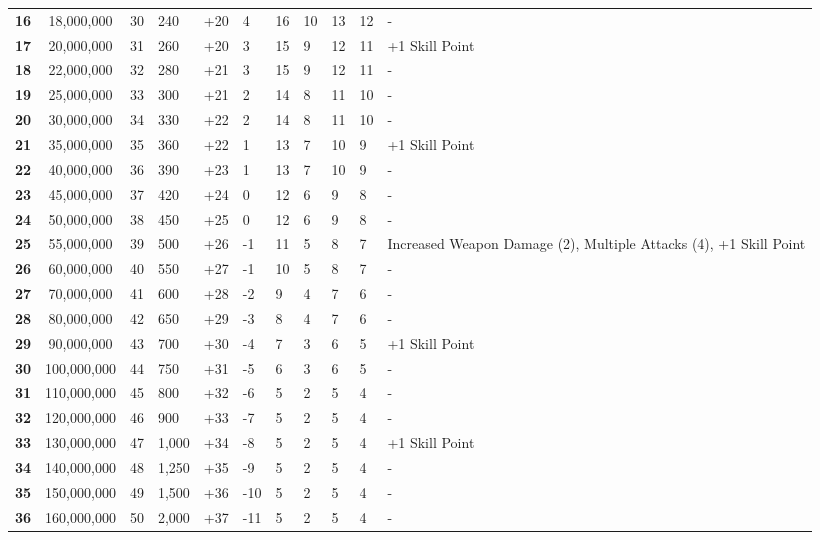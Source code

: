 \begin {table}[H]
\begin{tabularx}{\columnwidth}{>{\bfseries}ccM{.15in}M{.25in}M{.35in}M{.38in}M{.35in}M{.38in}M{.35in}M{.35in}Y}
	16 & 18,000,000 & 30 & 240 & +20 & 4 & 16 & 10 & 13 & 12 & -\\
	17 & 20,000,000 & 31 & 260 & +20 & 3 & 15 & 9 & 12 & 11 & +1 Skill Point\\
	18 & 22,000,000 & 32 & 280 & +21 & 3 & 15 & 9 & 12 & 11 & -\\
	19 & 25,000,000 & 33 & 300 & +21 & 2 & 14 & 8 & 11 & 10 & -\\
	20 & 30,000,000 & 34 & 330 & +22 & 2 & 14 & 8 & 11 & 10 & -\\
	21 & 35,000,000 & 35 & 360 & +22 & 1 & 13 & 7 & 10 & 9 & +1 Skill Point\\
	22 & 40,000,000 & 36 & 390 & +23 & 1 & 13 & 7 & 10 & 9 & -\\
	23 & 45,000,000 & 37 & 420 & +24 & 0 & 12 & 6 & 9 & 8 & -\\
	24 & 50,000,000 & 38 & 450 & +25 & 0 & 12 & 6 & 9 & 8 & -\\
	25 & 55,000,000 & 39 & 500 & +26 & -1 & 11 & 5 & 8 & 7 & Increased Weapon Damage (2), Multiple Attacks (4), +1 Skill Point\\
	26 & 60,000,000 & 40 & 550 & +27 & -1 & 10 & 5 & 8 & 7 & -\\
	27 & 70,000,000 & 41 & 600 & +28 & -2 & 9 & 4 & 7 & 6 & -\\
	28 & 80,000,000 & 42 & 650 & +29 & -3 & 8 & 4 & 7 & 6 & -\\
	29 & 90,000,000 & 43 & 700 & +30 & -4 & 7 & 3 & 6 & 5 & +1 Skill Point\\
	30 & 100,000,000 & 44 & 750 & +31 & -5 & 6 & 3 & 6 & 5 & -\\
	31 & 110,000,000 & 45 & 800 & +32 & -6 & 5 & 2 & 5 & 4 & -\\
	32 & 120,000,000 & 46 & 900 & +33 & -7 & 5 & 2 & 5 & 4 & -\\
	33 & 130,000,000 & 47 & 1,000 & +34 & -8 & 5 & 2 & 5 & 4 & +1 Skill Point\\
	34 & 140,000,000 & 48 & 1,250 & +35 & -9 & 5 & 2 & 5 & 4 & -\\
	35 & 150,000,000 & 49 & 1,500 & +36 & -10 & 5 & 2 & 5 & 4 & -\\
	36 & 160,000,000 & 50 & 2,000 & +37 & -11 & 5 & 2 & 5 & 4 & -
  \end {tabularx}
\end {table}
\newpage
